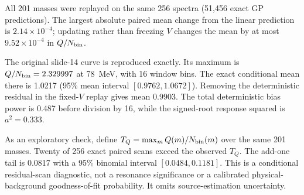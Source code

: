 
All 201 masses were replayed on the same 256 spectra (51,456 exact GP
predictions). The largest absolute paired mean change from the linear
prediction is $2.14\times10^{-4}$; updating rather than freezing $V$ changes
the mean by at most $9.52\times10^{-4}$ in $Q/N_{\rm bin}$.

The original slide-14 curve is reproduced exactly. Its maximum is
$Q/N_{\rm bin}=2.329997$ at 78~MeV, with 16 window bins. The exact
conditional mean there is 1.0217 (95\% mean interval $[0.9762,1.0672]$).
Removing the deterministic residual in the fixed-$V$ replay gives mean
0.9903. The total deterministic bias power is 0.487 before division by
16, while the signed-root response squared is $a^2=0.333$.

As an exploratory check, define $T_Q=\max_m Q(m)/N_{\rm bin}(m)$ over
the same 201 masses. Twenty of 256 exact paired scans exceed the observed
$T_Q$. The add-one tail is 0.0817 with a 95\% binomial interval
$[0.0484,0.1181]$. This is a conditional residual-scan diagnostic, not a
resonance significance or a calibrated physical-background goodness-of-fit
probability. It omits source-estimation uncertainty.

